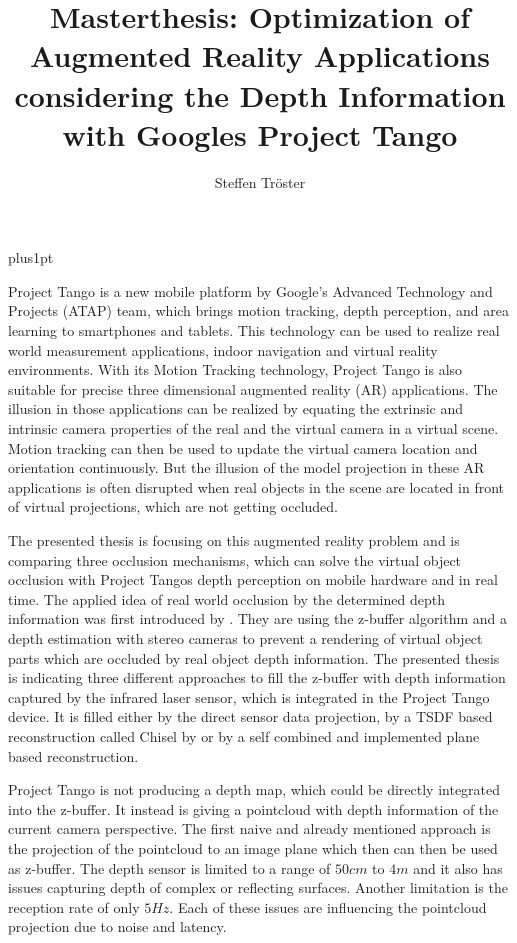 \documentclass[12pt]{support/thcolognereport}
\title{Masterthesis: Optimization of Augmented Reality Applications considering the Depth Information with Googles Project Tango}
\author{Steffen Tröster}
\begin{document}
\baselineskip=18pt plus1pt

\maketitle 

\setlength{\parskip}{1em}

Project Tango is a new mobile platform by Google’s Advanced Technology and Projects (ATAP) team, which brings motion tracking, depth perception, and area learning to smartphones and tablets. This technology can be used to realize real world measurement applications, indoor navigation and virtual reality environments.  With its Motion Tracking technology, Project Tango is also suitable for precise three dimensional augmented reality (AR) applications. The illusion in those applications can be realized by equating the extrinsic and intrinsic camera properties of the real and the virtual camera in a virtual scene. Motion tracking can then be used to update the virtual camera location and orientation continuously. But the illusion of the model projection in these AR applications is often disrupted when real objects in the scene are located in front of virtual projections, which are not getting occluded.

The presented thesis is focusing on this augmented reality problem and is comparing three occlusion mechanisms, which can solve the virtual object occlusion with Project Tangos depth perception on mobile hardware and in real time. The applied idea of real world occlusion by the determined depth information was first introduced by \citet{wloka1995resolving}. They are using the z-buffer algorithm and a depth estimation with stereo cameras to prevent a rendering of virtual object parts which are occluded by real object depth information. The presented thesis is indicating three different approaches to fill the z-buffer with depth information captured by the infrared laser sensor, which is integrated in the Project Tango device. It is filled either by the direct sensor data projection, by a TSDF based reconstruction called Chisel by \citet{Klingensmith_2015_7924} or by a self combined and implemented plane based reconstruction. 

Project Tango is not producing a depth map, which could be directly integrated into the z-buffer. It instead is giving a pointcloud with depth information of the current camera perspective. The first naive and already mentioned approach is the projection of the pointcloud to an image plane which then can then be used as z-buffer. The depth sensor is limited to a range of \(50cm\) to \(4m\) and it also has issues capturing depth of complex or reflecting surfaces. Another limitation is the reception rate of only \(5Hz\). Each of these issues are influencing the pointcloud projection due to noise and latency.
\end{document}
